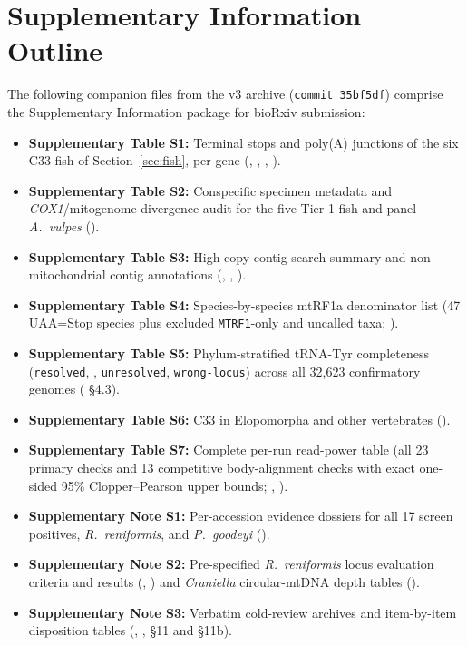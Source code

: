 \documentclass[11pt, a4paper]{article}
\begin{document}
\section*{Supplementary Information Outline}
The following companion files from the v3 archive (\texttt{commit 35bf5df}) comprise the Supplementary Information package for bioRxiv submission:
\begin{itemize}[leftmargin=1.4em, itemsep=0.25em]
\item \textbf{Supplementary Table S1:} Terminal stops and poly(A) junctions of the six C33 fish of Section~\ref{sec:fish}, per gene (, , , ).
\item \textbf{Supplementary Table S2:} Conspecific specimen metadata and \textit{COX1}/mitogenome divergence audit for the five Tier 1 fish and panel \textit{A.\ vulpes} ().
\item \textbf{Supplementary Table S3:} High-copy contig search summary and non-mitochondrial contig annotations (, , ).
\item \textbf{Supplementary Table S4:} Species-by-species mtRF1a denominator list (47 UAA=Stop species plus excluded \texttt{MTRF1}-only and uncalled taxa; ).
\item \textbf{Supplementary Table S5:} Phylum-stratified tRNA-Tyr completeness (\texttt{resolved}, , \texttt{unresolved}, \texttt{wrong-locus}) across all 32,623 confirmatory genomes ( \S 4.3).
\item \textbf{Supplementary Table S6:} C33 in Elopomorpha and other vertebrates ().
\item \textbf{Supplementary Table S7:} Complete per-run read-power table (all 23 primary checks and 13 competitive body-alignment checks with exact one-sided 95\% Clopper--Pearson upper bounds; , ).
\item \textbf{Supplementary Note S1:} Per-accession evidence dossiers for all 17 screen positives, \textit{R.\ reniformis}, and \textit{P.\ goodeyi} ().
\item \textbf{Supplementary Note S2:} Pre-specified \textit{R.\ reniformis} locus evaluation criteria and results (, ) and \textit{Craniella} circular-mtDNA depth tables ().
\item \textbf{Supplementary Note S3:} Verbatim cold-review archives and item-by-item disposition tables (, ,  \S 11 and \S 11b).
\end{itemize}
\end{document}
